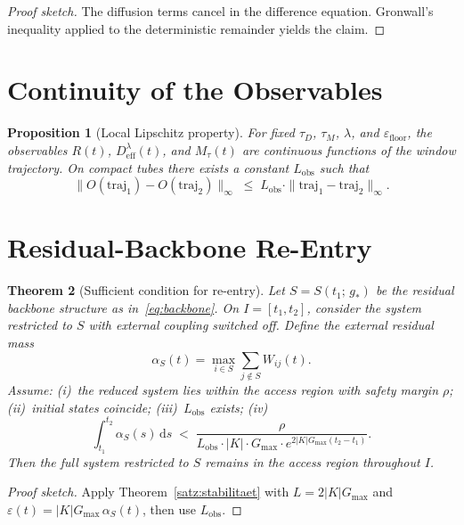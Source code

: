 \documentclass[11pt,a4paper]{article}
\theoremstyle{plain}
\newtheorem{theorem}{Theorem}[section]
\newtheorem{proposition}[theorem]{Proposition}
\theoremstyle{definition}
\theoremstyle{remark}
\newcommand{\Deff}{D_{\mathrm{eff}}}
\newcommand{\Mtau}{M_{\tau}}
\newcommand{\Gmax}{G_{\max}}
\newcommand{\Lobs}{L_{\mathrm{obs}}}
\begin{document}
\begin{proof}[Proof sketch]
The diffusion terms cancel in the difference equation. Gronwall's inequality applied to the deterministic remainder yields the claim.
\end{proof}

\section{Continuity of the Observables}

\begin{proposition}[Local Lipschitz property]
\label{prop:stetigkeit}
For fixed $\tau_D$, $\tau_M$, $\lambda$, and $\varepsilon_{\mathrm{floor}}$, the observables $R(t)$, $\Deff^{\lambda}(t)$, and $\Mtau(t)$ are continuous functions of the window trajectory. On compact tubes there exists a constant $\Lobs$ such that
\begin{equation}
\label{eq:Lobs}
\|O(\mathrm{traj}_1) - O(\mathrm{traj}_2)\|_{\infty} \;\leq\; \Lobs \cdot \|\mathrm{traj}_1 - \mathrm{traj}_2\|_{\infty}.
\end{equation}
\end{proposition}

\section{Residual-Backbone Re-Entry}

\begin{theorem}[Sufficient condition for re-entry]
\label{satz:reentry}
Let $S = S(t_1;\,g_*)$ be the residual backbone structure as in~\eqref{eq:backbone}. On $I = [t_1,t_2]$, consider the system restricted to $S$ with external coupling switched off. Define the external residual mass
\begin{equation}
\alpha_S(t) = \max_{i \in S}\sum_{j \notin S} W_{ij}(t).
\end{equation}
Assume: (i)~the reduced system lies within the access region with safety margin $\rho$; (ii)~initial states coincide; (iii)~$\Lobs$ exists; (iv)~
\begin{equation}
\label{eq:eta}
\int_{t_1}^{t_2} \alpha_S(s)\,\mathrm{d}s \;<\; \frac{\rho}{\Lobs \cdot |K| \cdot \Gmax \cdot e^{2|K|\Gmax(t_2 - t_1)}}.
\end{equation}
Then the full system restricted to $S$ remains in the access region throughout $I$.
\end{theorem}

\begin{proof}[Proof sketch]
Apply Theorem~\ref{satz:stabilitaet} with $L = 2|K|\Gmax$ and $\varepsilon(t) = |K|\Gmax\,\alpha_S(t)$, then use $\Lobs$.
\end{proof}
\end{document}
